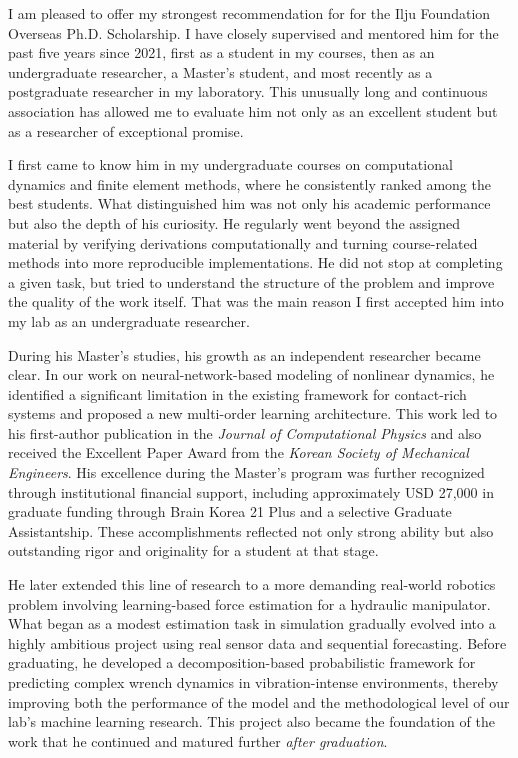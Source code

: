 I am pleased to offer my strongest recommendation for \ReferrerName{} for the Ilju Foundation Overseas Ph.D. Scholarship. I have closely supervised and mentored him for the past five years since 2021, first as a student in my courses, then as an undergraduate researcher, a Master's student, and most recently as a postgraduate researcher in my laboratory. This unusually long and continuous association has allowed me to evaluate him not only as an excellent student but as a researcher of exceptional promise.

I first came to know him in my undergraduate courses on computational dynamics and finite element methods, where he consistently ranked among the best students. What distinguished him was not only his academic performance but also the depth of his curiosity. He regularly went beyond the assigned material by verifying derivations computationally and turning course-related methods into more reproducible implementations. He did not stop at completing a given task, but tried to understand the structure of the problem and improve the quality of the work itself. That was the main reason I first accepted him into my lab as an undergraduate researcher.

During his Master's studies, his growth as an independent researcher became clear. In our work on neural-network-based modeling of nonlinear dynamics, he identified a significant limitation in the existing framework for contact-rich systems and proposed a new multi-order learning architecture. This work led to his first-author publication in the \textit{Journal of Computational Physics} and also received the Excellent Paper Award from the \textit{Korean Society of Mechanical Engineers}. His excellence during the Master's program was further recognized through institutional financial support, including approximately USD 27,000 in graduate funding through Brain Korea 21 Plus and a selective Graduate Assistantship. These accomplishments reflected not only strong ability but also outstanding rigor and originality for a student at that stage.

He later extended this line of research to a more demanding real-world robotics problem involving learning-based force estimation for a hydraulic manipulator. What began as a modest estimation task in simulation gradually evolved into a highly ambitious project using real sensor data and sequential forecasting. Before graduating, he developed a decomposition-based probabilistic framework for predicting complex wrench dynamics in vibration-intense environments, thereby improving both the performance of the model and the methodological level of our lab's machine learning research. This project also became the foundation of the work that he continued and matured further \textsl{after graduation}.


